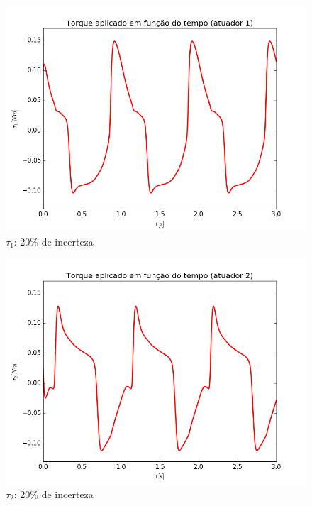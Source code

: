 \documentclass[]{politex}
\begin{document}
\begin{multicols}{2}
\begin{figure}[H]
	\centering
	\includegraphics[scale=0.42]{imagens/20/tau1.png}  
	\caption{$\tau_1$: 20\% de incerteza}
	\label{fig:Torque1_20}
\end{figure}
\begin{figure}[H]
	\centering
	\includegraphics[scale=0.42]{imagens/20/tau2.png}  
	\caption{$\tau_2$: 20\% de incerteza}
	\label{fig:Torque2_20}
\end{figure}
\end{multicols}
\end{document}
